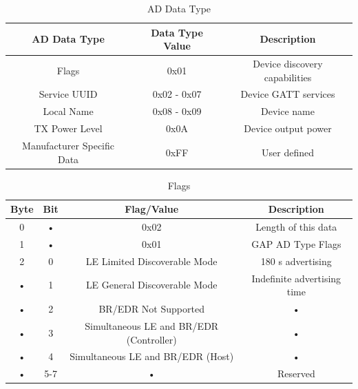 \begin{table}[htbp!!!]
	\begin{center}
\begin{tabular}{|c|c|c|}
\hline 
\rule[-1ex]{0pt}{2.5ex} AD Data Type & Data Type Value & Description \\ 
\hline 
\rule[-1ex]{0pt}{2.5ex} Flags & 0x01 & Device discovery capabilities \\ 
\hline 
\rule[-1ex]{0pt}{2.5ex} Service UUID & 0x02 - 0x07 & Device GATT services \\ 
\hline 
\rule[-1ex]{0pt}{2.5ex} Local Name & 0x08 - 0x09 & Device name \\ 
\hline 
\rule[-1ex]{0pt}{2.5ex} TX Power Level & 0x0A & Device output power \\ 
\hline 
\rule[-1ex]{0pt}{2.5ex} Manufacturer Specific Data & 0xFF & User defined \\ 
\hline 
\end{tabular} 
\caption[AD Data Type \cite{9_Teildokument_BT}]{AD Data Type}
\label{tab:AD_Data_Type}
\end{center}
\end{table}

\begin{table}[htbp!!!]
	\begin{center}
\begin{tabular}{|c|c|c|c|}
\hline 
\rule[-1ex]{0pt}{2.5ex} Byte & Bit & Flag/Value & Description \\ 
\hline 
\rule[-1ex]{0pt}{2.5ex} 0 & • & 0x02 & Length of this data \\ 
\hline 
\rule[-1ex]{0pt}{2.5ex} 1 & • & 0x01 & GAP AD Type Flags \\ 
\hline 
\rule[-1ex]{0pt}{2.5ex} 2 & 0 & LE Limited Discoverable Mode & 180 s advertising \\ 
\hline 
\rule[-1ex]{0pt}{2.5ex} • & 1 & LE General Discoverable Mode & Indefinite advertising time \\ 
\hline 
\rule[-1ex]{0pt}{2.5ex} • & 2 & BR/EDR Not Supported & • \\ 
\hline 
\rule[-1ex]{0pt}{2.5ex} • & 3 & Simultaneous LE and BR/EDR (Controller) & • \\ 
\hline 
\rule[-1ex]{0pt}{2.5ex} • & 4 & Simultaneous LE and BR/EDR (Host) & • \\ 
\hline 
\rule[-1ex]{0pt}{2.5ex} • & 5-7 & • & Reserved \\ 
\hline 
\end{tabular} 
\caption[Flags \cite{9_Teildokument_BT}]{Flags}
\label{tab:Flags}
\end{center}
\end{table}


